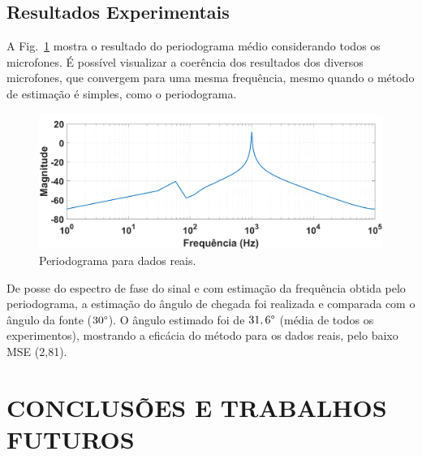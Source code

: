 \documentclass{sbrt2017port}
\begin{document}
\subsection{Resultados Experimentais}
A Fig.~\ref{fig:PSD_real} mostra o resultado do periodograma médio considerando todos os microfones. É possível visualizar a coerência dos resultados dos diversos microfones, que convergem para uma mesma frequência, mesmo quando o método de estimação é simples, como o periodograma.
\begin{figure}[!htb]
     \begin{center}
     \includegraphics[width=\linewidth]{images/PSD_data_real}
     \end{center}
     \caption{Periodograma para dados reais.}
     \label{fig:PSD_real}
\end{figure}

De posse do espectro de fase do sinal e com estimação da frequência obtida pelo periodograma, a estimação do ângulo de chegada foi realizada e comparada com o ângulo da fonte ($30\degree$). O ângulo estimado foi de $31,6\degree$ (média de todos os experimentos), mostrando a eficácia do método para os dados reais, pelo baixo MSE (2,81).


\section{CONCLUSÕES E TRABALHOS FUTUROS}
\label{sec_conclu}
\end{document}
